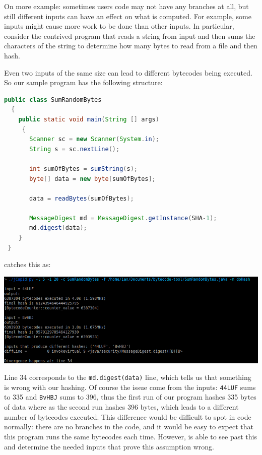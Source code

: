 On more example: sometimes users code may not have any branches at all, but
still different inputs can have an effect
on what is computed. For example, some inputs might cause more work to be done
than other inputs. In particular, consider
the contrived program that reads a string from input and then sums the characters of the string to determine
how many bytes to read from a file and then hash.

Even two inputs of the same size can lead to different bytecodes being executed. So our sample program has
the following structure:

\begin{center}
  \begin{lstlisting}[language=Java]
  public class SumRandomBytes
  {
    public static void main(String [] args)
     {
       Scanner sc = new Scanner(System.in);
       String s = sc.nextLine();
      
       int sumOfBytes = sumString(s);
       byte[] data = new byte[sumOfBytes];
    
       data = readBytes(sumOfBytes);
 
       MessageDigest md = MessageDigest.getInstance(SHA-1);
       md.digest(data);
    }
 }
 \end{lstlisting}
\end{center}

\jcupid catches this as:

\begin{center}
  \includegraphics[width=\linewidth]{jCupidSumRandomBytes}
\end{center}

Line 34 corresponds to the \texttt{md.digest(data)} line, which tells us that something is wrong with our
hashing. Of course the issue come from the inputs: \texttt{44LUF} sums to 335 and \texttt{BvHBJ} sums to 
396, thus the first run of our program hashes 335 bytes of data where as the second run hashes 396 bytes,
which leads to a different number of bytecodes executed. This difference would
be difficult to spot in code normally: there are no branches in the code, and
it would be easy to expect that this program runs the same bytecodes each time.
However, \jcupid is able to see past this and determine the needed inputs that
prove this assumption wrong.
